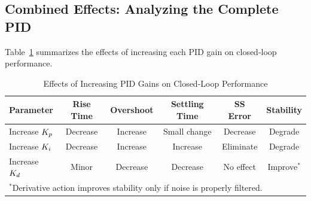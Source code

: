 \subsection{Combined Effects: Analyzing the Complete PID}

Table~\ref{tab:pid_effects} summarizes the effects of increasing each PID gain on closed-loop performance.

\begin{table}[htbp]
\centering
\caption{Effects of Increasing PID Gains on Closed-Loop Performance}
\label{tab:pid_effects}
\begin{tabular}{lccccc}
\toprule
\textbf{Parameter} & \textbf{Rise Time} & \textbf{Overshoot} & \textbf{Settling Time} & \textbf{SS Error} & \textbf{Stability} \\
\midrule
Increase $K_p$ & Decrease & Increase & Small change & Decrease & Degrade \\
Increase $K_i$ & Decrease & Increase & Increase & Eliminate & Degrade \\
Increase $K_d$ & Minor & Decrease & Decrease & No effect & Improve$^*$ \\
\bottomrule
\multicolumn{6}{l}{\scriptsize $^*$Derivative action improves stability only if noise is properly filtered.}
\end{tabular}
\end{table}


